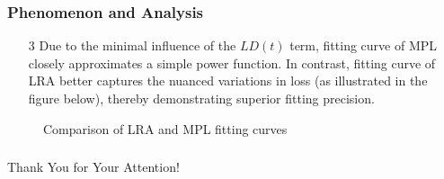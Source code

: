 \documentclass[aspectratio=169]{beamer}
\begin{document}
    \begin{frame}
        \frametitle{Phenomenon and Analysis}
        \begin{enumerate}
            \item[3] Due to the minimal influence of the $LD(t)$ term, fitting curve of MPL closely approximates a simple power function.
            In contrast, fitting curve of LRA better captures the nuanced variations in loss (as illustrated in the figure below), thereby demonstrating superior fitting precision.
        \end{enumerate}
        \begin{figure}
            \centering

            \caption{Comparison of LRA and MPL fitting curves}\label{fig:figure3}
        \end{figure}
    \end{frame}

    \begin{frame}
        \frametitle{}
        \begin{center}
            \Huge Thank You for Your Attention!
        \end{center}
    \end{frame}
\end{document}
